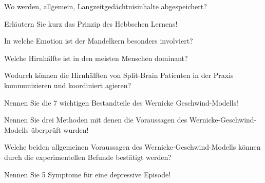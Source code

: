 \documentclass[10pt, a4paper]{exam}
\begin{document}
\begin{questions}
\begin{solution}
  \end{solution}

  \question Wo werden, allgemein, Langzeitgedächtnisinhalte abgespeichert?
  \begin{solution}

  \end{solution}

  \question Erläutern Sie kurz das Prinzip des Hebbschen Lernens!
  \begin{solution}

  \end{solution}

  \question In welche Emotion ist der Mandelkern besonders involviert?
  \begin{solution}

  \end{solution}

  \question Welche Hirnhälfte ist in den meisten Menschen dominant?
  \begin{solution}

  \end{solution}

  \question Wodurch können die Hirnhälften von Split-Brain Patienten in der Praxis kommunizieren und koordiniert agieren?
  \begin{solution}

  \end{solution}

  \question Nennen Sie die 7 wichtigen Bestandteile des Wernicke Geschwind-Modells!
  \begin{solution}

  \end{solution}

  \question Nennen Sie drei Methoden mit denen die Voraussagen des Wernicke-Geschwind-Modells überprüft wurden!
  \begin{solution}

  \end{solution}

  \question Welche beiden allgemeinen Voraussagen des Wernicke-Geschwind-Modells können durch die experimentellen Befunde bestätigt werden?
  \begin{solution}

  \end{solution}

  \question Nennen Sie 5 Symptome für eine depressive Episode!
  \begin{solution}

  \end{solution}


\end{questions}
\end{document}
